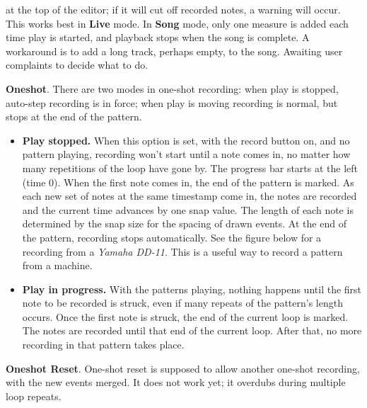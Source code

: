 \begin{enumber}
         at the top of the editor; if it will cut off recorded notes,
         a warning will occur.
         This works best in \textbf{Live} mode.
         In \textbf{Song} mode, only one measure is added each time play is
         started, and playback stops when the song is complete.
         A workaround is to add a long track, perhaps empty, to the song.
         Awaiting user complaints to decide what to do.
      \item \textbf{Oneshot}.
         There are two modes in one-shot recording:
         when play is stopped, auto-step recording is in force; when play
         is moving recording is normal, but stops at the end of the pattern.
         \begin{itemize}
            \item \textbf{Play stopped.}
               When this option is set, with the record button on, and no
               pattern playing, recording won't start until a note comes in,
               no matter how many repetitions of the loop have gone by.  The
               progress bar starts at the left (time 0).  When the first
               note comes in, the end of the pattern is marked.  As each new
               set of notes at the same timestamp come in, the notes are
               recorded and the current time advances by one snap value.
               The length of each note is determined by the snap size for
               the spacing of drawn events.  At the end of the pattern,
               recording stops automatically.  See the figure below for a
               recording from a \textsl{Yamaha DD-11}.  This is a useful way
               to record a pattern from a machine.
            \item \textbf{Play in progress.}
               With the patterns playing, nothing happens until the first
               note to be recorded is struck, even if many repeats of the
               pattern's length occurs.
               Once the first note is struck, the end of the current loop
               is marked.
               The notes are recorded until that end of the current loop.
               After that, no more recording in that pattern takes place.
         \end{itemize}
      \item \textbf{Oneshot Reset}.
               One-shot reset is supposed to allow another one-shot
               recording, with the new events merged.
               It does not work yet; it overdubs during multiple loop
               repeats.
   \end{enumber}

